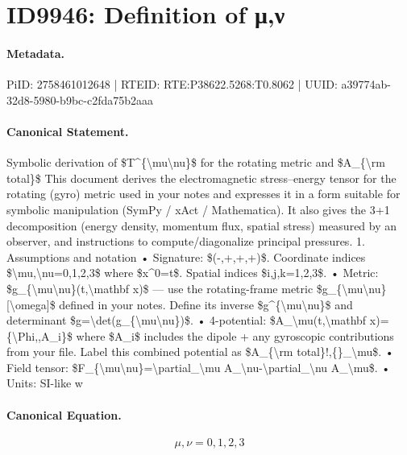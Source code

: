 \section*{ID9946: Definition of μ,ν}
\paragraph{Metadata.}
PiID: 2758461012648 | RTEID: RTE:P38622.5268:T0.8062 | UUID: a39774ab-32d8-5980-b9bc-c2fda75b2aaa

\paragraph{Canonical Statement.}
Symbolic derivation of \$T\textasciicircum{}\{\textbackslash{}mu\textbackslash{}nu\}\$ for the rotating metric and \$A\_\{\textbackslash{}rm total\}\$ This document derives the electromagnetic stress–energy tensor for the rotating (gyro) metric used in your notes and expresses it in a form suitable for symbolic manipulation (SymPy / xAct / Mathematica). It also gives the 3+1 decomposition (energy density, momentum flux, spatial stress) measured by an observer, and instructions to compute/diagonalize principal pressures. 1. Assumptions and notation • Signature: \$(-,+,+,+)\$. Coordinate indices \$\textbackslash{}mu,\textbackslash{}nu=0,1,2,3\$ where \$x\textasciicircum{}0=t\$. Spatial indices \$i,j,k=1,2,3\$. • Metric: \$g\_\{\textbackslash{}mu\textbackslash{}nu\}(t,\textbackslash{}mathbf x)\$ — use the rotating-frame metric \$g\_\{\textbackslash{}mu\textbackslash{}nu\}[\textbackslash{}omega]\$ defined in your notes. Define its inverse \$g\textasciicircum{}\{\textbackslash{}mu\textbackslash{}nu\}\$ and determinant \$g=\textbackslash{}det(g\_\{\textbackslash{}mu\textbackslash{}nu\})\$. • 4-potential: \$A\_\textbackslash{}mu(t,\textbackslash{}mathbf x)=\{\textbackslash{}Phi,,A\_i\}\$ where \$A\_i\$ includes the dipole + any gyroscopic contributions from your file. Label this combined potential as \$A\_\{\textbackslash{}rm total\}!,\{\}\_\textbackslash{}mu\$. • Field tensor: \$F\_\{\textbackslash{}mu\textbackslash{}nu\}=\textbackslash{}partial\_\textbackslash{}mu A\_\textbackslash{}nu-\textbackslash{}partial\_\textbackslash{}nu A\_\textbackslash{}mu\$. • Units: SI-like w

\paragraph{Canonical Equation.}
\[
\mu,\nu=0,1,2,3
\]

